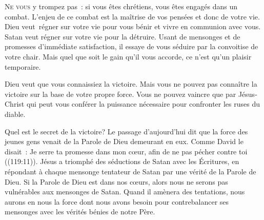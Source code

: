 




\lettrine{N}{e vous} y trompez pas~: si vous êtes chrétiens,
 vous êtes engagés dans un combat. L'enjeu de ce combat est la maîtrise
 de vos pensées et donc de votre vie.
 Dieu veut~régner sur votre vie
 pour vous bénir et vivre en communion avec vous.
 Satan veut régner sur votre vie pour la détruire.
 Usant de mensonges et de promesses d'immédiate satisfaction,
 il essaye de vous séduire par la convoitise de votre chair.
 Mais quel que soit le gain qu'il vous accorde,
 ce n'est qu'un plaisir temporaire.


Dieu veut que vous connaissiez la victoire. Mais vous ne pouvez pas connaître
 la victoire sur la base de votre propre force. Vous ne pouvez vaincre
 que par Jésus-Christ qui peut vous conférer la puissance nécessaire pour
 confronter les ruses du diable.

Quel est le secret de la victoire? Le passage d'aujourd'hui dit que la force
 des jeunes gens venait de la Parole de Dieu demeurant en eux.
 Comme David le disait~: 
 \og Je serre ta promesse dans mon cœur, afin de ne pas pécher contre toi \fg{}
 ((119:11)).
 Jésus a triomphé des séductions de Satan avec les Écritures, en répondant
 à chaque mensonge tentateur de Satan par une vérité de la Parole de Dieu.
 Si la Parole de Dieu est dans nos c\oe{}urs, alors nous ne serons pas
 vulnérables aux mensonges de Satan.
 Quand il amènera des tentations, nous aurons en nous la force dont nous
 avons besoin pour contrebalancer ses mensonges avec les vérités bénies 
 de notre Père.


\dvrule






